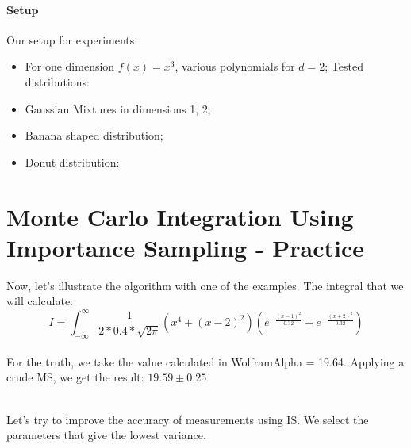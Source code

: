 \documentclass{article}
\begin{document}
\paragraph{Setup}
Our setup for experiments:
\begin{itemize}
	\item For one dimension ${f(x)=x^3}$, various polynomials for ${d =2}$; Tested distributions:
	\item Gaussian Mixtures in dimensions 1, 2;
	\item Banana shaped distribution;
	\item Donut distribution:
\end{itemize}

\section{Monte Carlo Integration Using Importance Sampling - Practice}
Now, let's illustrate the algorithm with one of the examples.
The integral that we will calculate:
\newline
	\begin{equation}\label{eq:fourierrow}
		I = \int_{-\infty}^{\infty}\frac{1}{2*0.4*\sqrt{2\pi}}(x^4+{(x-2)}^2)(e^{-\frac{{(x-1)}^2}{0.32}}+e^{-\frac{{(x+2)}^2}{0.32}})
	\end{equation}\\

For the truth, we take the value calculated in WolframAlpha = 19.64. Applying a crude MS, we get the result: ${19.59 \pm 0.25}$
\newline
\begin{figure}[h!]
\end{figure}\\

Let's try to improve the accuracy of measurements using IS. We select the parameters that give the lowest variance.
\newline
\begin{figure}[h!]
\end{figure}
\end{document}
